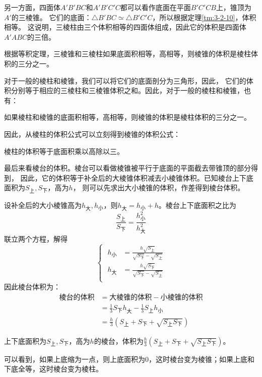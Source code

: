 \documentclass[12pt,UTF8,fontset=none]{ctexbook}
\begin{document}
另一方面，四面体$A'B'BC$和$A'B'C'C$都可以看作底面在平面$B'C'CB$上，锥顶为$A'$的三棱锥。
它们的底面：$\triangle B'BC \simeq \triangle B'C'C$，所以根据定理\ref{tm:3-2-10}，体积相等。
这说明，三棱柱由三个体积相等的四面体组成，因此它的体积是四面体$A'ABC$的三倍。

根据等积定理，三棱锥和三棱柱如果底面积相等，高相等，则棱锥的体积是棱柱体积的三分之一。

对于一般的棱柱和棱锥，我们可以将它们的底面剖分为三角形，因此，
它们的体积分别等于相应的三棱柱和三棱锥体积之和。因此，对于一般的棱柱和棱锥，也有：
\begin{tm}\label{tm:3-2-20}
    如果棱柱和棱锥的底面积相等，高相等，则棱锥的体积是棱柱体积的三分之一。
\end{tm}
因此，从棱柱的体积公式可以立刻得到棱锥的体积公式：
\begin{tm}\label{tm:3-2-30}
    棱柱的体积等于底面积乘以高除以三。
\end{tm}

最后来看棱台的体积。棱台可以看做棱锥被平行于底面的平面截去带锥顶的部分得到，
因此，它的体积等于补全后的大棱锥体积减去小棱锥体积。已知棱台上下底面积为$S_{\text{上}},S_{\text{下}}$，高为$h$，
则可以先求出大小棱锥的体积，作差得到棱台体积。

设补全后的大小棱锥高为$h_{\text{大}},h_{\text{小}}$，则$h_{\text{大}} = h_{\text{小}} + h$。棱台上下底面积之比为
$$ \frac{S_{\text{上}}}{S_{\text{下}}} = \frac{h_{\text{小}}^2}{h_{\text{大}}^2} $$
联立两个方程，解得
$$ 
    \left\{\,\,
    \begin{array}{cl}
        h_{\text{小}} &= \frac{h\sqrt{S_{\text{上}}}}{\sqrt{S_{\text{下}}} - \sqrt{S_{\text{上}}}} \\
        h_{\text{大}} &= \frac{h\sqrt{S_{\text{下}}}}{\sqrt{S_{\text{下}}} - \sqrt{S_{\text{上}}}} \\
    \end{array}
    \right.
$$
因此棱台体积为：
\begin{align*}
    \text{棱台的体积} &= \text{大棱锥的体积} - \text{小棱锥的体积}  \\
    &= \frac{1}{3}S_{\text{下}}h_{\text{大}} - \frac{1}{3}S_{\text{上}}h_{\text{小}} \\
    &= \frac{h}{3}\left(S_{\text{上}} + S_{\text{下}} + \sqrt{S_{\text{上}}S_{\text{下}}}\right) 
\end{align*}
\begin{tm}\label{tm:3-2-40}
    上下底面积为$S_{\text{上}},S_{\text{下}}$，高为$h$的棱台，体积为$\frac{h}{3}\left(S_{\text{上}} + S_{\text{下}} + \sqrt{S_{\text{上}}S_{\text{下}}}\right)$。
\end{tm}
可以看到，如果上底缩为一点，则上底面积为$0$，这时棱台变为棱锥；如果上底和下底全等，这时棱台变为棱柱。
\end{document}
